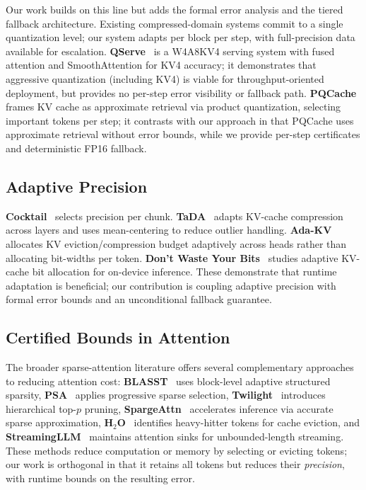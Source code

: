 \documentclass[10pt,twocolumn,a4paper]{article}
\theoremstyle{definition}
\theoremstyle{remark}
\begin{document}
Our work builds on this line but adds the formal error analysis and the tiered fallback architecture.  Existing compressed-domain systems commit to a single quantization level; our system adapts per block per step, with full-precision data available for escalation.  \textbf{QServe}~\cite{qserve} is a W4A8KV4 serving system with fused attention and SmoothAttention for KV4 accuracy; it demonstrates that aggressive quantization (including KV4) is viable for throughput-oriented deployment, but provides no per-step error visibility or fallback path.  \textbf{PQCache}~\cite{pqcache} frames KV cache as approximate retrieval via product quantization, selecting important tokens per step; it contrasts with our approach in that PQCache uses approximate retrieval without error bounds, while we provide per-step certificates and deterministic FP16 fallback.

\subsection{Adaptive Precision}

\textbf{Cocktail}~\cite{cocktail} selects precision per chunk.  \textbf{TaDA}~\cite{tada} adapts KV-cache compression across layers and uses mean-centering to reduce outlier handling.  \textbf{Ada-KV}~\cite{adakv} allocates KV eviction/compression budget adaptively across heads rather than allocating bit-widths per token.  \textbf{Don't Waste Your Bits}~\cite{dontwastebits} studies adaptive KV-cache bit allocation for on-device inference.  These demonstrate that runtime adaptation is beneficial; our contribution is coupling adaptive precision with formal error bounds and an unconditional fallback guarantee.

\subsection{Certified Bounds in Attention}

The broader sparse-attention literature offers several complementary approaches to reducing attention cost: \textbf{BLASST}~\cite{blasst} uses block-level adaptive structured sparsity, \textbf{PSA}~\cite{psa} applies progressive sparse selection, \textbf{Twilight}~\cite{twilight} introduces hierarchical top-$p$ pruning, \textbf{SpargeAttn}~\cite{spargeattn} accelerates inference via accurate sparse approximation, \textbf{H$_2$O}~\cite{h2o} identifies heavy-hitter tokens for cache eviction, and \textbf{StreamingLLM}~\cite{streamingattn} maintains attention sinks for unbounded-length streaming.  These methods reduce computation or memory by selecting or evicting tokens; our work is orthogonal in that it retains all tokens but reduces their \emph{precision}, with runtime bounds on the resulting error.
\end{document}
